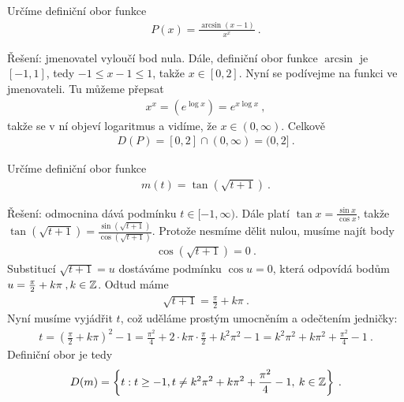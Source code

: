 \begin{example}
    Určíme definiční obor funkce \begin{align*}
        P(x) = \frac{\arcsin (x-1)}{x^x} \:.
    \end{align*}

    Řešení: jmenovatel vyloučí bod nula. Dále, definiční obor funkce $\arcsin$ je $[-1,1]$, tedy $ -1 \leq x-1 \leq 1$, takže $x \in [0,2]$. 
    Nyní se podívejme na funkci ve jmenovateli. Tu můžeme přepsat \begin{align*}
        x^x = \left( e^{\log x} \right) = e^{x \log x} \:,
    \end{align*}
    takže se v ní objeví logaritmus a vidíme, že $x \in (0, \infty)$.
    Celkově \begin{align*}
        \boxed{ D(P) = [0,2] \cap (0, \infty) = (0,2] } \:.
    \end{align*}

\end{example}

\begin{example}
    Určíme definiční obor funkce 
    \begin{align*}
        m(t) = \tan (\sqrt{t+1}) \:.
    \end{align*}

    Řešení: odmocnina dává podmínku $t \in [-1,\infty)$. Dále platí $\tan x = \frac{\sin x}{\cos x} $, takže $\tan (\sqrt {t+1}) = \frac{\sin (\sqrt {t+1})}{\cos (\sqrt {t+1})}$. Protože nesmíme dělit nulou, musíme najít body \begin{align*}
        \cos (\sqrt{t+1}) = 0 \:.
    \end{align*}
    Substitucí $\sqrt{t+1} = u$ dostáváme podmínku $\cos u =0$, která odpovídá bodům $u = \frac{\pi}{2} + k \pi \:, k \in \mathbb{Z}$. Odtud máme \begin{align*}
        \sqrt{t+1} = \frac{\pi}{2} + k \pi \:.
    \end{align*}
    Nyní musíme vyjádřit $t$, což uděláme prostým umocněním a odečtením jedničky:
    \begin{align*}
        t =  \left( \frac{\pi}{2} + k \pi \right)^2 - 1 = \frac{\pi^2}{4} + 2 \cdot k \pi \cdot \frac{\pi}{2} + k^2 \pi^2 - 1 = k^2 \pi^2 + k \pi^2 + \frac{\pi^2}{4} - 1 \:.
    \end{align*}
    Definiční obor je tedy \begin{align*}
        D(m) = \left \lbrace t : t \geq -1, t \neq k^2 \pi^2 + k \pi^2 + \frac{\pi^2}{4} - 1, \: k \in \mathbb{Z} \right \rbrace \:.
    \end{align*}
\end{example}

